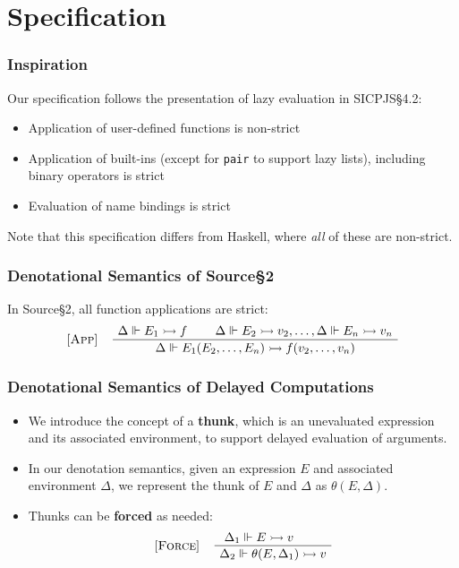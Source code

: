 \documentclass[12pt]{beamer}
\makeatletter
\newenvironment{boxedprooftree}[1][c]
 {\begin{tabular}[#1]{@{}c@{}}}
 {\DisplayProof\end{tabular}}
\makeatother
\begin{document}
\section{Specification}

\begin{frame}
\frametitle{Inspiration}
Our specification follows the presentation of lazy evaluation in SICPJS\S4.2:\pause[1]
\begin{itemize}
\item<2->Application of user-defined functions is non-strict
\item<3->Application of built-ins (except for \texttt{pair} to support lazy lists), including binary operators is strict
\item<4->Evaluation of name bindings is strict
\end{itemize}
\pause[5]Note that this specification differs from Haskell, where \textit{all} of these are non-strict.
\end{frame}

\begin{frame}
\frametitle{Denotational Semantics of Source\S2}
In Source\S2, all function applications are strict:
\[
\begin{tabular}{@{} l c @{}}
[\textsc{App}] &
  \begin{boxedprooftree}
  \AxiomC{$\Delta\Vdash E_1\rightarrowtail f$}
  \AxiomC{$\Delta\Vdash E_2\rightarrowtail v_2,\ldots,\Delta\Vdash E_n\rightarrowtail v_n$}
  \BinaryInfC{$\Delta\Vdash E_1(E_2,\ldots,E_n)\rightarrowtail f(v_2,\ldots,v_n)$}
  \end{boxedprooftree}
\end{tabular}
\]
\end{frame}

\begin{frame}
\frametitle{Denotational Semantics of Delayed Computations}
\begin{itemize}
\item<1-> We introduce the concept of a \textbf{thunk}, which is an unevaluated expression and its associated environment, to support delayed evaluation of arguments.
\item<2-> In our denotation semantics, given an expression $E$ and associated environment $\Delta$, we represent the thunk of $E$ and $\Delta$ as $\theta(E, \Delta)$.
\item<3-> Thunks can be \textbf{forced} as needed:
\[
\begin{tabular}{@{} l c @{}}
[\textsc{Force}] &
  \begin{boxedprooftree}
  \AxiomC{$\Delta_1\Vdash E \rightarrowtail v$}
  \AxiomC{}
  \BinaryInfC{$\Delta_2\Vdash\theta(E, \Delta_1)\rightarrowtail v$}
  \end{boxedprooftree}
\end{tabular}
\]
\end{itemize}

\end{frame}
\end{document}
